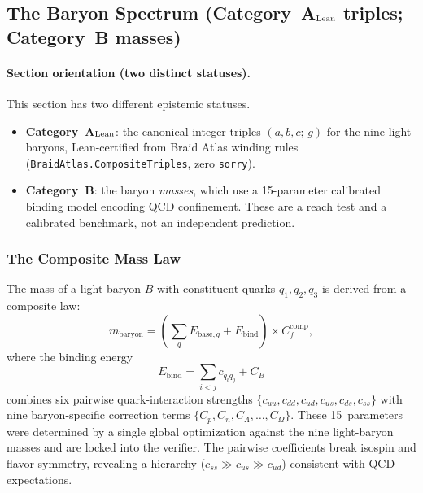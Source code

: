 \documentclass[11pt]{article}
\theoremstyle{remark}
\newcommand{\Cf}{C_{\!f}}
\begin{document}
\subsection{The Baryon Spectrum (Category~A$_{\rm Lean}$ triples; Category~B masses)}\label{sec:baryons_ext}

\paragraph{Section orientation (two distinct statuses).}
This section has two different epistemic statuses.
\begin{itemize}[leftmargin=1.4em,itemsep=0.1em,topsep=0.2em]
  \item \textbf{Category~A$_{\rm Lean}$}: the canonical integer triples $(a,b,c;\,g)$ for the nine light baryons, Lean-certified from Braid Atlas winding rules (\texttt{BraidAtlas.CompositeTriples}, zero \texttt{sorry}).
  \item \textbf{Category~B}: the baryon \emph{masses}, which use a 15-parameter calibrated binding model encoding QCD confinement.  These are a reach test and a calibrated benchmark, not an independent prediction.
\end{itemize}

\subsubsection{The Composite Mass Law}

The mass of a light baryon $B$ with constituent quarks $q_1, q_2, q_3$ is derived from a composite law:
\begin{equation}
m_{\mathrm{baryon}} = \left(\sum_q E_{\mathrm{base},q} + E_{\mathrm{bind}}\right) \times \Cf^{\mathrm{comp}},
\label{eq:composite}
\end{equation}
where the binding energy
\begin{equation}
E_{\mathrm{bind}} = \sum_{i<j} c_{q_i q_j} + C_B
\label{eq:binding}
\end{equation}
combines six pairwise quark-interaction strengths $\{c_{uu}, c_{dd}, c_{ud}, c_{us}, c_{ds}, c_{ss}\}$ with nine baryon-specific correction terms $\{C_p, C_n, C_\Lambda, \ldots, C_\Omega\}$.
These 15~parameters were determined by a single global optimization against the nine light-baryon masses and are locked into the verifier.
The pairwise coefficients break isospin and flavor symmetry, revealing a hierarchy ($c_{ss} \gg c_{us} \gg c_{ud}$) consistent with QCD expectations.
\end{document}
